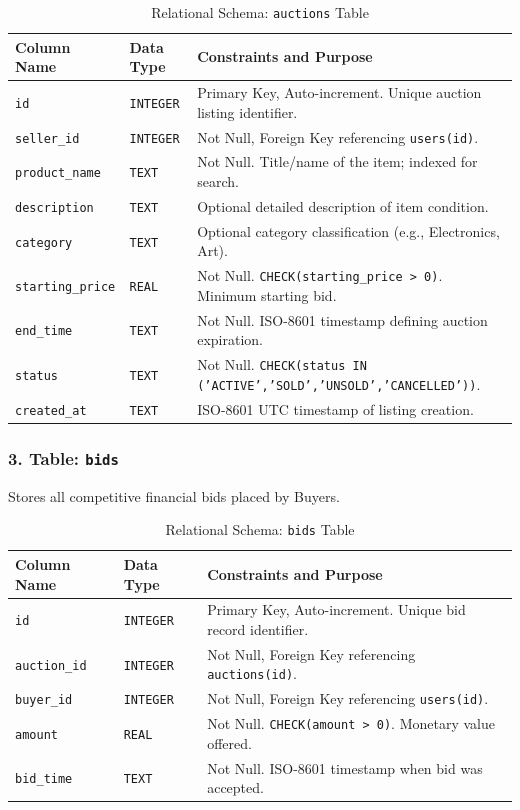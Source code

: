 \begin{table}[H]
\centering
\small
\caption{Relational Schema: \texttt{auctions} Table}
\label{tab:schema_auctions}
\begin{tabularx}{\textwidth}{p{3cm}p{2.5cm}X}
\toprule
\textbf{Column Name} & \textbf{Data Type} & \textbf{Constraints and Purpose} \\
\midrule
\texttt{id} & \texttt{INTEGER} & Primary Key, Auto-increment. Unique auction listing identifier. \\
\texttt{seller\_id} & \texttt{INTEGER} & Not Null, Foreign Key referencing \texttt{users(id)}. \\
\texttt{product\_name} & \texttt{TEXT} & Not Null. Title/name of the item; indexed for search. \\
\texttt{description} & \texttt{TEXT} & Optional detailed description of item condition. \\
\texttt{category} & \texttt{TEXT} & Optional category classification (e.g., Electronics, Art). \\
\texttt{starting\_price}& \texttt{REAL} & Not Null. \texttt{CHECK(starting\_price > 0)}. Minimum starting bid. \\
\texttt{end\_time} & \texttt{TEXT} & Not Null. ISO-8601 timestamp defining auction expiration. \\
\texttt{status} & \texttt{TEXT} & Not Null. \texttt{CHECK(status IN ('ACTIVE','SOLD','UNSOLD','CANCELLED'))}. \\
\texttt{created\_at} & \texttt{TEXT} & ISO-8601 UTC timestamp of listing creation. \\
\bottomrule
\end{tabularx}
\end{table}

\subsubsection{3. Table: \texttt{bids}}
Stores all competitive financial bids placed by Buyers.

\begin{table}[H]
\centering
\small
\caption{Relational Schema: \texttt{bids} Table}
\label{tab:schema_bids}
\begin{tabularx}{\textwidth}{p{3cm}p{2.5cm}X}
\toprule
\textbf{Column Name} & \textbf{Data Type} & \textbf{Constraints and Purpose} \\
\midrule
\texttt{id} & \texttt{INTEGER} & Primary Key, Auto-increment. Unique bid record identifier. \\
\texttt{auction\_id} & \texttt{INTEGER} & Not Null, Foreign Key referencing \texttt{auctions(id)}. \\
\texttt{buyer\_id} & \texttt{INTEGER} & Not Null, Foreign Key referencing \texttt{users(id)}. \\
\texttt{amount} & \texttt{REAL} & Not Null. \texttt{CHECK(amount > 0)}. Monetary value offered. \\
\texttt{bid\_time} & \texttt{TEXT} & Not Null. ISO-8601 timestamp when bid was accepted. \\
\bottomrule
\end{tabularx}
\end{table}


